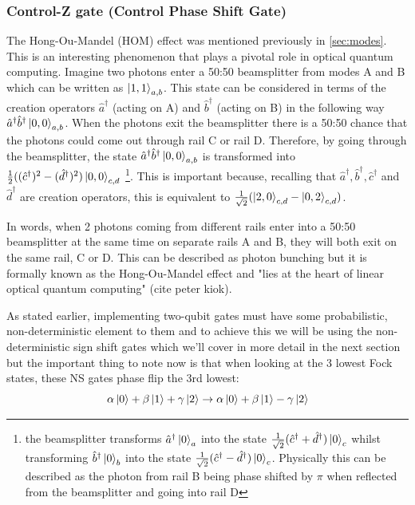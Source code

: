 \subsubsection{Control-Z gate (Control Phase Shift Gate)}
The Hong-Ou-Mandel (HOM) effect was mentioned previously in \cref{sec:modes}. This is an interesting phenomenon that plays a pivotal role in optical quantum computing. Imagine two photons enter a 50:50 beamsplitter from modes A and B which can be written as $\ket{1,1}_{a,b}$. This state can be considered in terms of the creation operators $\hat{a}^\dagger$ (acting on A) and $\hat{b}^\dagger$ (acting on B) in the following way $\hat{a}^\dagger\hat{b}^\dagger\ket{0,0}_{a,b}$. When the photons exit the beamsplitter there is a 50:50 chance that the photons could come out through rail C or rail D. Therefore, by going through the beamsplitter, the state $\hat{a}^\dagger\hat{b}^\dagger\ket{0,0}_{a,b}$ is transformed into $\frac{1}{2}((\hat{c}^\dagger)^2 - (\hat{d}^\dagger)^2)\ket{0,0}_{c,d}$ \footnote{ the beamsplitter transforms $\hat{a}^\dagger\ket{0}_a$ into the state $\frac{1}{\sqrt{2}}(\hat{c}^\dagger + \hat{d}^\dagger)\ket{0}_c$ whilst transforming  $\hat{b}^\dagger\ket{0}_b$ into the state $\frac{1}{\sqrt{2}}(\hat{c}^\dagger - \hat{d}^\dagger)\ket{0}_c$. Physically this can be described as the photon from rail B being phase shifted by $\pi$ when reflected from the beamsplitter and going into rail D}. This is important because, recalling that $\hat{a}^\dagger, \hat{b}^\dagger, \hat{c}^\dagger$ and $\hat{d}^\dagger$ are creation operators, this is equivalent to $\frac{1}{\sqrt{2}}(\ket{2,0}_{c,d} - \ket{0,2}_{c,d})$.

In words, when 2 photons coming from different rails enter into a 50:50 beamsplitter at the same time on separate rails A and B, they will both exit on the same rail, C or D. This can be described as photon bunching but it is formally known as the Hong-Ou-Mandel effect and "lies at the heart of linear optical quantum computing" (cite peter kiok).

As stated earlier, implementing two-qubit gates must have some probabilistic, non-deterministic element to them and to achieve this we will be using the non-deterministic sign shift gates which we'll cover in more detail in the next section but the important thing to note now is that when looking at the 3 lowest Fock states, these NS gates phase flip the 3rd lowest:
\begin{equation} \label{NS evolution}
    \alpha\ket{0} + \beta\ket{1} + \gamma\ket{2} \rightarrow \alpha\ket{0} + \beta\ket{1} - \gamma\ket{2}
\end{equation}


